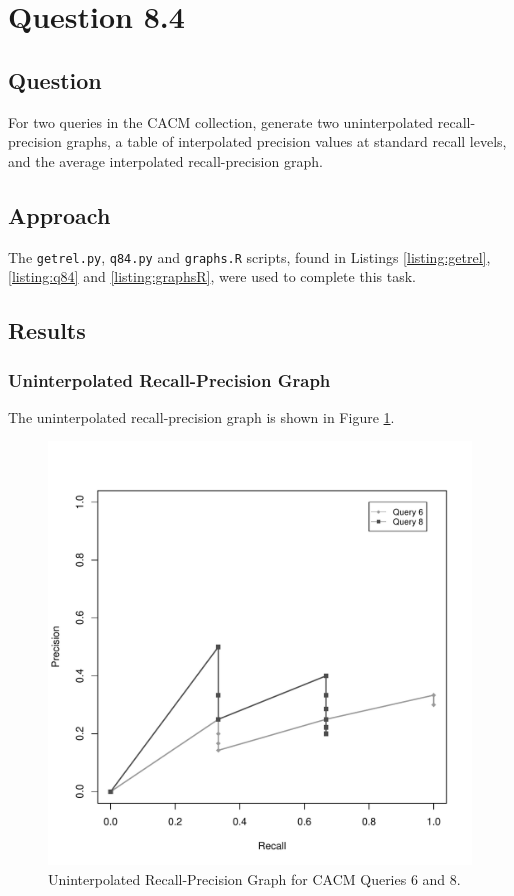 \section{Question 8.4}


\subsection{Question}
For two queries in the CACM collection, generate two uninterpolated recall-precision graphs, a table of interpolated precision values at standard recall levels, and the average interpolated recall-precision graph.


\subsection{Approach}
The \texttt{getrel.py}, \texttt{q84.py} and \texttt{graphs.R} scripts, found in Listings \ref{listing:getrel}, \ref{listing:q84} and \ref{listing:graphsR}, were used to complete this task.


\subsection{Results}

\subsubsection{Uninterpolated Recall-Precision Graph}
The uninterpolated recall-precision graph is shown in Figure \ref{fig:urpgraph68}.

\begin{figure}[H]
\centering
\label{fig:urpgraph68}
\includegraphics[scale=.7]{code/getrel/urpg68.pdf}
\caption{Uninterpolated Recall-Precision Graph for CACM Queries 6 and 8.}
\end{figure}


